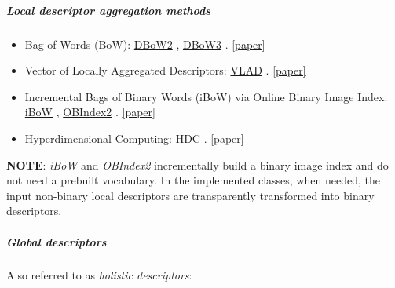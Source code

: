 \documentclass{article}
\let\oldsubparagraph\subparagraph
\renewcommand{\subparagraph}[1]{\oldsubparagraph{#1}\mbox{}}
\begin{document}
\hypertarget{local-descriptor-aggregation-methods}{%
\subparagraph{Local descriptor aggregation
methods}\label{local-descriptor-aggregation-methods}}

\begin{itemize}
    \item Bag of Words (BoW): \href{https://github.com/dorian3d/DBoW2}{DBoW2} \cite{galvez2012bags}, \href{https://github.com/rmsalinas/DBow3}{DBoW3} \cite{galvez2012bags}.  \href{https://doi.org/10.1109/TRO.2012.2197158}{[paper]}
    \item Vector of Locally Aggregated Descriptors: \href{https://www.vlfeat.org/api/vlad.html}{VLAD} \cite{jegou2010aggregating}.  \href{https://doi.org/10.1109/CVPR.2010.5540039}{[paper]}
    \item Incremental Bags of Binary Words (iBoW) via Online Binary Image Index: \href{https://github.com/emiliofidalgo/ibow-lcd}{iBoW} \cite{garcia2018ibow}, \href{https://github.com/emiliofidalgo/obindex2}{OBIndex2} \cite{garcia2018ibow}.  \href{https://doi.org/10.1109/LRA.2018.2849609}{[paper]}
    \item Hyperdimensional Computing: \href{https://www.tu-chemnitz.de/etit/proaut/hdc_desc}{HDC} \cite{neubert2021hyperdimensional}.  \href{https://openaccess.thecvf.com/content/CVPR2021/html/Neubert_Hyperdimensional_Computing_as_a_Framework_for_Systematic_Aggregation_of_Image_CVPR_2021_paper.html}{[paper]}
\end{itemize}

\textbf{NOTE}: \emph{iBoW} and \emph{OBIndex2} incrementally build a
binary image index and do not need a prebuilt vocabulary. In the
implemented classes, when needed, the input non-binary local descriptors
are transparently transformed into binary descriptors.

\hypertarget{global-descriptors}{%
\subparagraph{Global descriptors}\label{global-descriptors}}

Also referred to as \emph{holistic descriptors}:
\end{document}
